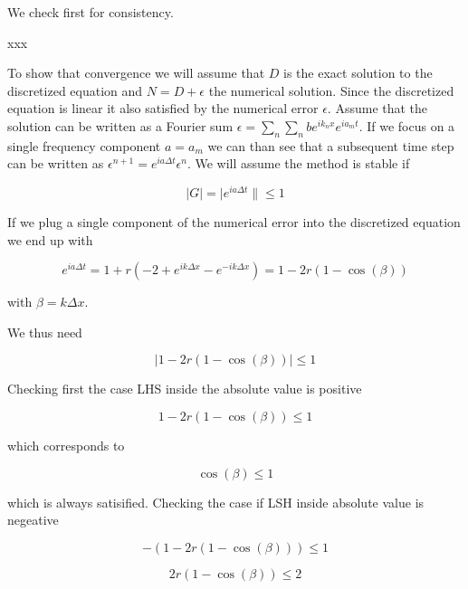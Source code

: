 \documentclass{article}
\begin{document}
We check first for consistency.

xxx

To show that convergence we will assume that $D$ is the exact solution to the discretized equation and $N = D+\epsilon$ the numerical solution. Since the discretized equation is linear it also satisfied by the numerical error $\epsilon$. Assume that the solution can be written as a Fourier sum $\epsilon = \sum_n\sum_n b e^{ik_nx}e^{ia_mt}$. If we focus on a single frequency component $a = a_m$  we can than see that a subsequent time step can be written as $\epsilon^{n+1}=e^{ia\Delta t}\epsilon^n$. We will assume the method is stable if 

\begin{equation}	
	|G| = |e^{ia\Delta t}\| \leq 1
\end{equation}

If we plug a single component of the numerical error into the discretized equation we end up with

\begin{equation}
 	e^{ia\Delta t} = 1 + r(-2+e^{ik\Delta x}-e^{-ik\Delta x}) = 1 - 2r(1-\cos(\beta))
\end{equation}

with $\beta = k \Delta x$.

We thus need

\begin{equation}
	|1 - 2r(1-\cos(\beta))| \leq 1
\end{equation}

Checking first the case LHS inside the absolute value is positive

\begin{equation}
	1 - 2r(1-\cos(\beta)) \leq 1
\end{equation}

which corresponds to 

\begin{equation}
	\cos(\beta) \leq 1
\end{equation}

which is always satisified. Checking the case if LSH inside absolute value is negeative

\begin{equation}
	-(1 - 2r(1-\cos(\beta))) \leq 1
\end{equation}

\begin{equation}
	 2r(1-\cos(\beta)) \leq 2
\end{equation}
\end{document}
